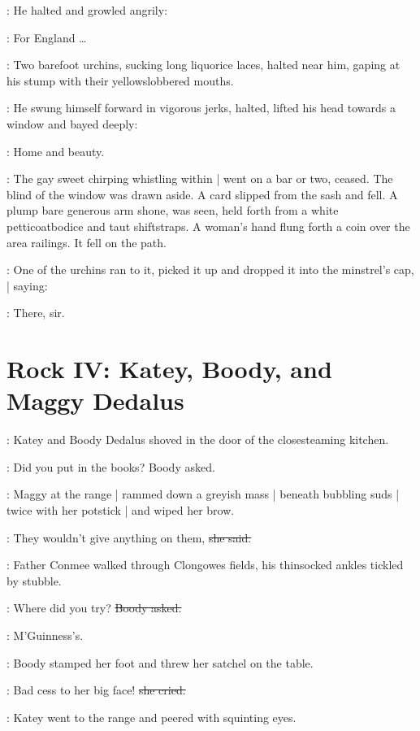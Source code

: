 :
He halted and growled angrily:

\sailor:
For England \ldots

:
Two barefoot urchins,
sucking long liquorice laces,
halted near him,
gaping at his stump with their yellowslobbered mouths.

:
He swung himself forward in vigorous jerks,
halted,
lifted his head towards a window
and bayed deeply:

\sailor:
Home and beauty.

:
The gay sweet chirping whistling within |
went on a bar or two, ceased.
The blind of the window was drawn aside.
A card 
slipped from the sash and fell.
A plump bare generous arm shone,
was seen,
held forth from a white petticoatbodice and taut shiftstraps.
A woman's hand flung forth a coin
over the area railings.
It fell on the path.

:
One of the urchins ran to it,
picked it up and dropped it into the minstrel's cap, |
saying:

\boy:
There, sir.


\section*{Rock IV: Katey, Boody, and Maggy Dedalus}

:
Katey and Boody Dedalus shoved in the door
of the closesteaming kitchen.

\boody:
Did you put in the books?
Boody asked.

:
Maggy at the range |
rammed down a greyish mass |
beneath bubbling suds |
twice with her potstick |
and wiped her brow.

\maggy:
They wouldn't give anything on them,
\sout{she said.}

\begin{interject}
    :
    Father Conmee walked through Clongowes fields,
    his thinsocked ankles tickled by stubble.
\end{interject}

\boody:
Where did you try?
\sout{Boody asked.}

\maggy:
M'Guinness's.

:
Boody stamped her foot and threw her satchel on the table.

\boody:
Bad cess to her big face!
\sout{she cried.}

:
Katey went to the range
and peered with squinting eyes.

